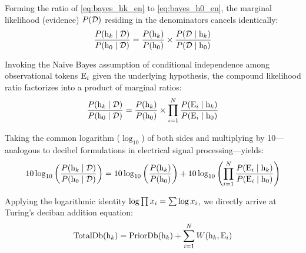     Forming the ratio of \eqref{eq:bayes_hk_en} to \eqref{eq:bayes_h0_en}, the marginal likelihood (evidence) $P( \mathcal{D} )$ residing in the denominators cancels identically:
    \begin{equation}
        \frac{P( \mathrm{h}_{k} \mid \mathcal{D} )}{P( \mathrm{h}_0 \mid \mathcal{D} )} = \frac{P( \mathrm{h}_{k} )}{P( \mathrm{h}_0 )} \times \frac{P( \mathcal{D} \mid \mathrm{h}_{k} )}{P( \mathcal{D} \mid \mathrm{h}_0 )}
        \label{eq:odds_ratio_basic_en}
    \end{equation}

    Invoking the Naive Bayes assumption of conditional independence among observational tokens $\mathrm{E}_{i}$ given the underlying hypothesis, the compound likelihood ratio factorizes into a product of marginal ratios:
    \begin{equation}
        \frac{P( \mathrm{h}_{k} \mid \mathcal{D} )}{P( \mathrm{h}_0 \mid \mathcal{D} )} = \frac{P( \mathrm{h}_{k} )}{P( \mathrm{h}_0 )} \times \prod_{i=1}^{N} \frac{P( \mathrm{E}_{i} \mid \mathrm{h}_{k} )}{P( \mathrm{E}_{i} \mid \mathrm{h}_0 )}
        \label{eq:naive_bayes_odds_prod_en}
    \end{equation}

    Taking the common logarithm ($\log_{10}$) of both sides and multiplying by 10—analogous to decibel formulations in electrical signal processing—yields:
    \begin{equation}
        10 \log_{10} \left( \frac{P( \mathrm{h}_{k} \mid \mathcal{D} )}{P( \mathrm{h}_0 \mid \mathcal{D} )} \right) = 10 \log_{10} \left( \frac{P( \mathrm{h}_{k} )}{P( \mathrm{h}_0 )} \right) + 10 \log_{10} \left( \prod_{i=1}^{N} \frac{P( \mathrm{E}_{i} \mid \mathrm{h}_{k} )}{P( \mathrm{E}_{i} \mid \mathrm{h}_0 )} \right)
    \end{equation}

    Applying the logarithmic identity $\log \prod x_{i} = \sum \log x_{i}$, we directly arrive at Turing's deciban addition equation:
    \begin{equation}
        \text{TotalDb}(\mathrm{h}_{k}) = \text{PriorDb}(\mathrm{h}_{k}) + \sum_{i=1}^{N} W(\mathrm{h}_{k}, \mathrm{E}_{i})
        \label{eq:turing_deciban_addition_en}
    \end{equation}

